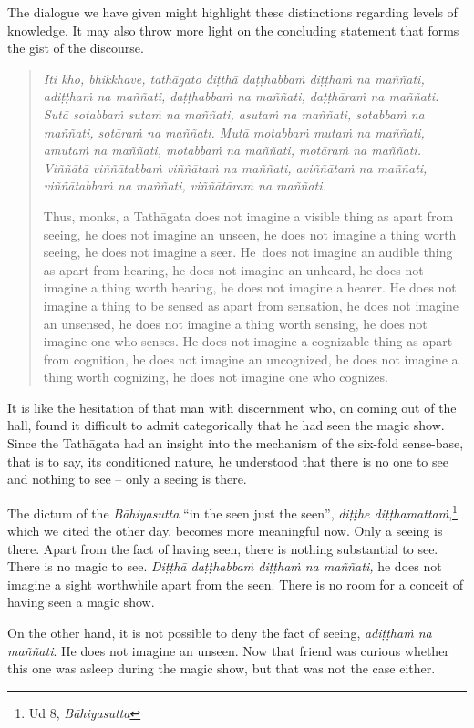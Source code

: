 The dialogue we have given might highlight these distinctions regarding levels of knowledge. It may also throw more light on the concluding statement that forms the gist of the discourse.

\begin{quote}
\emph{Iti kho, bhikkhave, tathāgato diṭṭhā daṭṭhabbaṁ diṭṭhaṁ na maññati, adiṭṭhaṁ na maññati, daṭṭhabbaṁ na maññati, daṭṭhāraṁ na maññati. Sutā sotabbaṁ sutaṁ na maññati, asutaṁ na maññati, sotabbaṁ na maññati, sotāraṁ na maññati. Mutā motabbaṁ mutaṁ na maññati, amutaṁ na maññati, motabbaṁ na maññati, motāraṁ na maññati. Viññātā viññātabbaṁ viññātaṁ na maññati, aviññātaṁ na maññati, viññātabbaṁ na maññati, viññātāraṁ na maññati.}

Thus, monks, a Tathāgata does not imagine a visible thing as apart from seeing, he does not imagine an unseen, he does not imagine a thing worth seeing, he does not imagine a seer. He~does not imagine an audible thing as apart from hearing, he does not imagine an unheard, he does not imagine a thing worth hearing, he does not imagine a hearer. He does not imagine a thing to be sensed as apart from sensation, he does not imagine an unsensed, he does not imagine a thing worth sensing, he does not imagine one who senses. He does not imagine a cognizable thing as apart from cognition, he does not imagine an uncognized, he does not imagine a thing worth cognizing, he does not imagine one who cognizes.
\end{quote}

It is like the hesitation of that man with discernment who, on coming out of the hall, found it difficult to admit categorically that he had seen the magic show. Since the Tathāgata had an insight into the mechanism of the six-fold sense-base, that is to say, its conditioned nature, he understood that there is no one to see and nothing to see -- only a seeing is there.

The dictum of the \emph{Bāhiyasutta} ``in the seen just the seen'', \emph{diṭṭhe diṭṭhamattaṁ},\footnote{Ud 8, \emph{Bāhiyasutta}} which we cited the other day, becomes more meaningful now. Only a seeing is there. Apart from the fact of having seen, there is nothing substantial to see. There is no magic to see. \emph{Diṭṭhā daṭṭhabbaṁ diṭṭhaṁ na maññati,} he does not imagine a sight worthwhile apart from the seen. There is no room for a conceit of having seen a magic show.

On the other hand, it is not possible to deny the fact of seeing, \emph{adiṭṭhaṁ na maññati}. He does not imagine an unseen. Now that friend was curious whether this one was asleep during the magic show, but that was not the case either.

